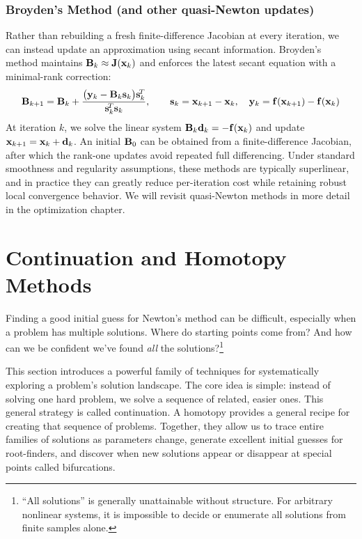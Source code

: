 \subsubsection{Broyden's Method (and other quasi-Newton updates)}
Rather than rebuilding a fresh finite-difference Jacobian at every iteration, we can instead update an approximation using secant information. Broyden's method maintains $\mathbf{B}_k \approx \mathbf{J}(\mathbf{x}_k)$ and enforces the latest secant equation with a minimal-rank correction:
\[
  \mathbf{B}_{k+1}
  =
  \mathbf{B}_k
  +
  \frac{\bigl(\mathbf{y}_k - \mathbf{B}_k \mathbf{s}_k\bigr)\mathbf{s}_k^{\!T}}
       {\mathbf{s}_k^{\!T}\mathbf{s}_k},
  \qquad
  \mathbf{s}_k = \mathbf{x}_{k+1}-\mathbf{x}_k,
  \quad
  \mathbf{y}_k = \mathbf{f}(\mathbf{x}_{k+1})-\mathbf{f}(\mathbf{x}_k)
\]
At iteration $k$, we solve the linear system $\mathbf{B}_k \mathbf{d}_k = -\mathbf{f}(\mathbf{x}_k)$ and update $\mathbf{x}_{k+1}=\mathbf{x}_k+\mathbf{d}_k$. An initial $\mathbf{B}_0$ can be obtained from a finite-difference Jacobian, after which the rank-one updates avoid repeated full differencing. Under standard smoothness and regularity assumptions, these methods are typically superlinear, and in practice they can greatly reduce per-iteration cost while retaining robust local convergence behavior. We will revisit quasi-Newton methods in more detail in the optimization chapter.


\section{Continuation and Homotopy Methods}

Finding a good initial guess for Newton's method can be difficult, especially when a problem has multiple solutions. Where do starting points come from? And how can we be confident we've found \emph{all} the solutions?\footnote{``All solutions'' is generally unattainable without structure. For arbitrary nonlinear systems, it is impossible to decide or enumerate all solutions from finite samples alone.}

This section introduces a powerful family of techniques for systematically exploring a problem's solution landscape. The core idea is simple: instead of solving one hard problem, we solve a sequence of related, easier ones. This general strategy is called continuation. A homotopy provides a general recipe for creating that sequence of problems. Together, they allow us to trace entire families of solutions as parameters change, generate excellent initial guesses for root-finders, and discover when new solutions appear or disappear at special points called bifurcations.

